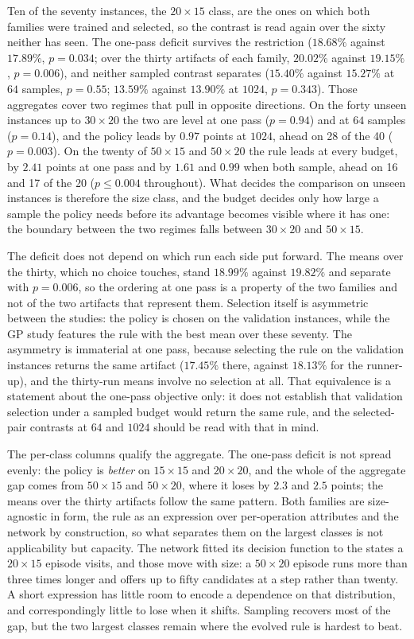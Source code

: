 \documentclass[preprint,12pt]{elsarticle}
\theoremstyle{definition}
\theoremstyle{remark}
\begin{document}
Ten of the seventy instances, the $20{\times}15$ class, are the ones
on which both families were trained and selected, so the contrast is
read again over the sixty neither has seen. The one-pass deficit
survives the restriction ($18.68\%$ against $17.89\%$, $p=0.034$; over
the thirty artifacts of each family, $20.02\%$ against $19.15\%$,
$p=0.006$), and neither sampled contrast separates ($15.40\%$ against
$15.27\%$ at $64$ samples, $p=0.55$; $13.59\%$ against $13.90\%$ at
$1024$, $p=0.343$). Those aggregates cover two regimes that pull in
opposite directions. On the forty unseen instances up to
$30{\times}20$ the two are level at one pass ($p=0.94$) and at $64$
samples ($p=0.14$), and the policy leads by $0.97$ points at $1024$,
ahead on 28 of the 40 ($p=0.003$). On the twenty of $50{\times}15$
and $50{\times}20$ the rule leads at every budget, by $2.41$ points at
one pass and by $1.61$ and $0.99$ when both sample, ahead on 16 and 17
of the 20 ($p\le0.004$ throughout). What decides the comparison on
unseen instances is therefore the size class, and the budget decides
only how large a sample the policy needs before its advantage becomes
visible where it has one: the boundary between the two regimes falls
between $30{\times}20$ and $50{\times}15$.

The deficit does not depend on which run each side put forward. The
means over the thirty, which no choice touches, stand $18.99\%$
against $19.82\%$ and separate with $p=0.006$, so the ordering at one
pass is a property of the two families and not of the two artifacts
that represent them. Selection itself is asymmetric between the
studies: the policy is chosen on the validation instances, while the
GP study features the rule with the best mean over these seventy. The
asymmetry is immaterial at one pass, because selecting the rule on
the validation instances returns the same artifact ($17.45\%$ there,
against $18.13\%$ for the runner-up), and the thirty-run means
involve no selection at all. That equivalence is a statement about
the one-pass objective only: it does not establish that validation
selection under a sampled budget would return the same rule, and the
selected-pair contrasts at $64$ and $1024$ should be read with that
in mind.

The per-class columns qualify the aggregate. The one-pass deficit is
not spread evenly: the policy is \emph{better} on $15{\times}15$
and $20{\times}20$, and the whole of the aggregate gap comes from
$50{\times}15$ and $50{\times}20$, where it loses by $2.3$ and $2.5$
points; the means over the thirty artifacts follow the same pattern.
Both families are size-agnostic in form, the rule as an expression
over per-operation attributes and the network by construction, so
what separates them on the largest classes is not applicability but
capacity. The network fitted its decision function to the states a
$20{\times}15$ episode visits, and those move with size: a
$50{\times}20$ episode runs more than three times longer and offers
up to fifty candidates at a step rather than twenty. A short
expression has little room to encode a dependence on that
distribution, and correspondingly little to lose when it shifts.
Sampling recovers most of the gap, but the two largest classes remain
where the evolved rule is hardest to beat.
\end{document}
